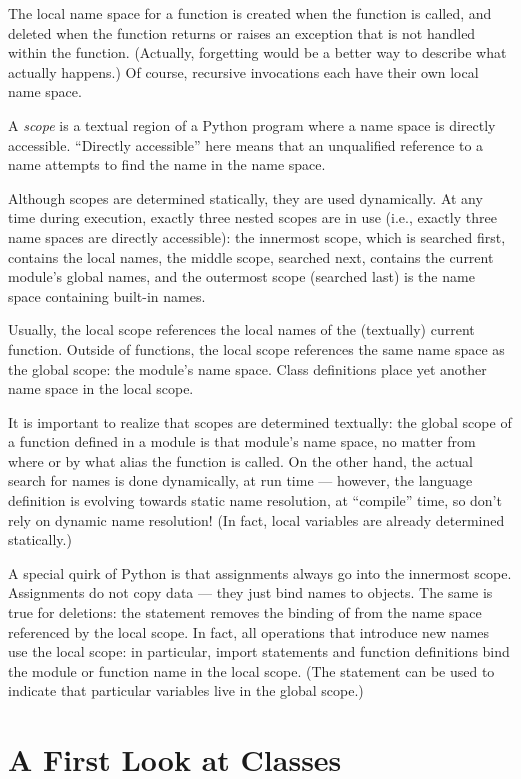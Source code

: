 \documentclass{manual}
\begin{document}
The local name space for a function is created when the function is
called, and deleted when the function returns or raises an exception
that is not handled within the function.  (Actually, forgetting would
be a better way to describe what actually happens.)  Of course,
recursive invocations each have their own local name space.

A \emph{scope} is a textual region of a Python program where a name space
is directly accessible.  ``Directly accessible'' here means that an
unqualified reference to a name attempts to find the name in the name
space.

Although scopes are determined statically, they are used dynamically.
At any time during execution, exactly three nested scopes are in use
(i.e., exactly three name spaces are directly accessible): the
innermost scope, which is searched first, contains the local names,
the middle scope, searched next, contains the current module's global
names, and the outermost scope (searched last) is the name space
containing built-in names.

Usually, the local scope references the local names of the (textually)
current function.  Outside of functions, the local scope references
the same name space as the global scope: the module's name space.
Class definitions place yet another name space in the local scope.

It is important to realize that scopes are determined textually: the
global scope of a function defined in a module is that module's name
space, no matter from where or by what alias the function is called.
On the other hand, the actual search for names is done dynamically, at
run time --- however, the language definition is evolving towards
static name resolution, at ``compile'' time, so don't rely on dynamic
name resolution!  (In fact, local variables are already determined
statically.)

A special quirk of Python is that assignments always go into the
innermost scope.  Assignments do not copy data --- they just
bind names to objects.  The same is true for deletions: the statement
 removes the binding of  from the name space
referenced by the local scope.  In fact, all operations that introduce
new names use the local scope: in particular, import statements and
function definitions bind the module or function name in the local
scope.  (The  statement can be used to indicate that
particular variables live in the global scope.)


\section{A First Look at Classes}
\label{firstClasses}
\end{document}
